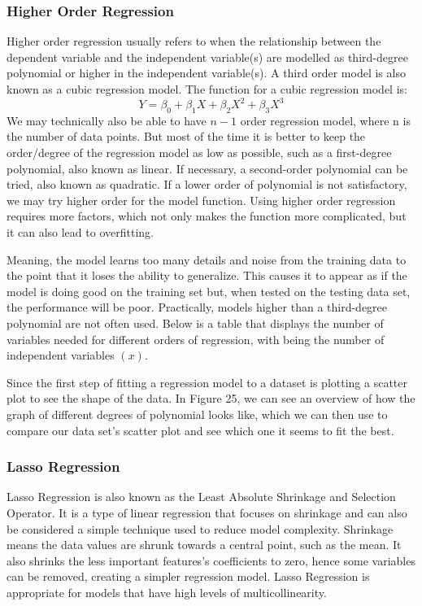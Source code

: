 \documentclass[a4paper,12pt]{report}
\begin{document}
\subsubsection{Higher Order Regression}
Higher order regression usually refers to when the relationship between the dependent variable and the independent variable(s) are modelled as third-degree polynomial or higher in the independent variable(s). A third order model is also known as a cubic regression model. The function for a cubic regression model is:
$$Y=\beta_0+\beta_1X+\beta_2X^2+\beta_3X^3$$
We may technically also be able to have $n - 1$ order regression model, where n is the number of data points. But most of the time it is better to keep the order/degree of the regression model as low as possible, such as a first-degree polynomial, also known as linear. If necessary, a second-order polynomial can be tried, also known as quadratic. If a lower order of polynomial is not satisfactory, we may try higher order for the model function. Using higher order regression requires more factors, which not only makes the function more complicated, but it can also lead to overfitting.

Meaning, the model learns too many details and noise from the training data to the point that it loses the ability to generalize. This causes it to appear as if the model is doing good on the training set but, when tested on the testing data set, the performance will be poor. Practically, models higher than a third-degree polynomial are not often used. Below is a table that displays the number of variables needed for different orders of regression, with  being the number of independent variables $(x)$.

Since the first step of fitting a regression model to a dataset is plotting a scatter plot to see the shape of the data. In Figure 25, we can see an overview of how the graph of different degrees of polynomial looks like, which we can then use to compare our data set’s scatter plot and see which one it seems to fit the best. 

\subsubsection{Lasso Regression}
Lasso Regression is also known as the Least Absolute Shrinkage and Selection Operator. It is a type of linear regression that focuses on shrinkage and can also be considered a simple technique used to reduce model complexity. Shrinkage means the data values are shrunk towards a central point, such as the mean. It also shrinks the less important features’s coefficients to zero, hence some variables can be removed, creating a simpler regression model. Lasso Regression is appropriate for models that have high levels of multicollinearity. 
\end{document}
